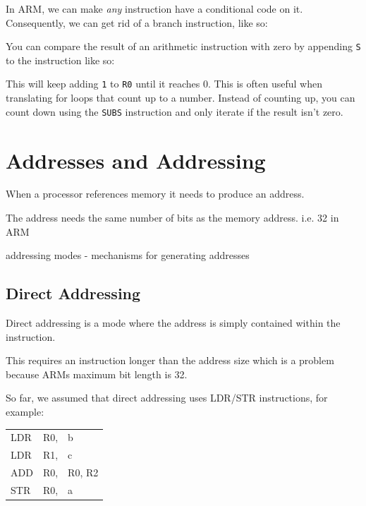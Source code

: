 In ARM, we can make {\it any} instruction have a conditional code on it.
Consequently, we can get rid of a branch instruction, like so:


You can compare the result of an arithmetic instruction with zero by appending
{\tt S} to the instruction like so:


This will keep adding {\tt 1} to {\tt R0} until it reaches 0. This is often
useful when translating for loops that count up to a number. Instead of counting
up, you can count down using the {\tt SUBS} instruction and only iterate if the
result isn't zero.


\section{Addresses and Addressing}
When a processor references memory it needs to produce an address.

The address needs the same number of bits as the memory address. i.e. 32 in ARM

addressing modes - mechanisms for generating addresses

\subsection{Direct Addressing}

Direct addressing is a mode where the address is simply contained within the
instruction.

This requires an instruction longer than the address size which is a problem
because ARMs maximum bit length is 32.

So far, we assumed that direct addressing uses LDR/STR instructions, for
example:

\begin{center}
    \begin{tabular}{l l l}
        LDR & R0, & b\\
        LDR & R1, & c\\
        ADD & R0, & R0, R2\\
        STR & R0, & a \\
    \end{tabular}
\end{center}

